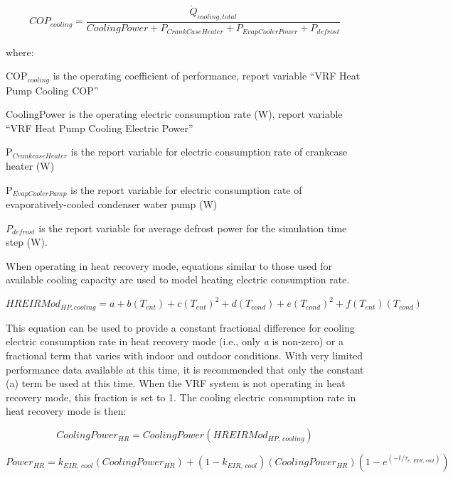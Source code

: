 \begin{equation}
  COP_{cooling} = \frac{\dot{Q}_{cooling,total}}{CoolingPower + P_{CrankCaseHeater} + P_{EvapCoolerPower} + P_{defrost}}
\end{equation}

where:

COP\(_{cooling}\) is the operating coefficient of performance, report variable ``VRF Heat Pump Cooling COP''

CoolingPower is the operating electric consumption rate (W), report variable ``VRF Heat Pump Cooling Electric Power''

P\(_{CrankcaseHeater}\) is the report variable for electric consumption rate of crankcase heater (W)

P\(_{EvapCoolerPump}\) is the report variable for electric consumption rate of evaporatively-cooled condenser water pump (W)

\({P_{defrost}}\) is the report variable for average defrost power for the simulation time step (W).

When operating in heat recovery mode, equations similar to those used for available cooling capacity are used to model heating electric consumption rate.

\begin{equation}
  HREIRMod_{HP,cooling} = a + b \left( T_{ent} \right) + c \left( T_{ent} \right)^2 + d \left( T_{cond} \right) + e \left( T_{cond} \right)^2 + f \left( T_{ent} \right) \left( T_{cond} \right)
\end{equation}

This equation can be used to provide a constant fractional difference for cooling electric consumption rate in heat recovery mode (i.e., only \emph{a} is non-zero) or a fractional term that varies with indoor and outdoor conditions. With very limited performance data available at this time, it is recommended that only the constant (a) term be used at this time. When the VRF system is not operating in heat recovery mode, this fraction is set to 1. The cooling electric consumption rate in heat recovery mode is then:

\begin{equation}
  CoolingPower_{HR} = CoolingPower \left( HREIRMod_{HP,\,cooling} \right)
\end{equation}

\begin{equation}
  Power_{HR} = k_{EIR,\,cool} \left( CoolingPower_{HR} \right) + \left( 1 - k_{EIR,\,cool} \right) \left( CoolingPower_{HR} \right) \left( 1 - e^{\left( -t / \tau_{c,\,EIR,\,cool} \right)} \right)
\end{equation}

